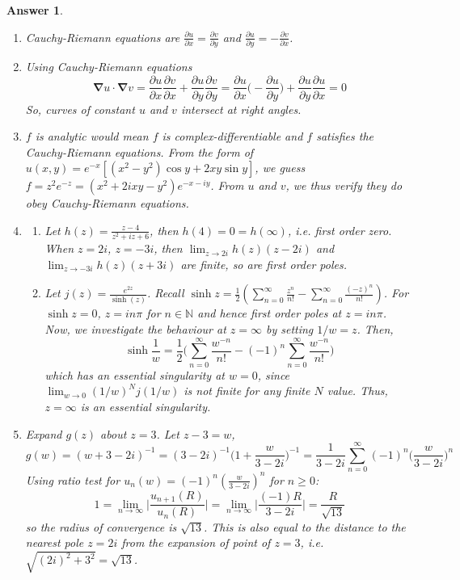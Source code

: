 \documentclass[a4paper]{article}
\newtheorem{ans}{Answer}[section]
\theoremstyle{new}
\begin{document}
\begin{ans}\leavevmode
\begin{enumerate}[label=(\alph*)]
\item Cauchy-Riemann equations are $\frac{\partial u}{\partial x}=\frac{\partial v}{\partial y}$ and $\frac{\partial u}{\partial y}=-\frac{\partial v}{\partial x}$.
\item Using Cauchy-Riemann equations
$$\boldsymbol{\nabla}u\cdot\boldsymbol{\nabla}v=\frac{\partial u}{\partial x}\frac{\partial v}{\partial x}+\frac{\partial u}{\partial y}\frac{\partial v}{\partial y}=\frac{\partial u}{\partial x}\bigg(-\frac{\partial u}{\partial y}\bigg)+\frac{\partial u}{\partial y}\frac{\partial u}{\partial x}=0$$
So, curves of constant $u$ and $v$ intersect at right angles.
\item $f$ is analytic would mean $f$ is complex-differentiable and $f$ satisfies the Cauchy-Riemann equations. From the form of $u(x,y)=e^{-x}[(x^2-y^2)\cos y+2xy\sin y]$, we guess $f=z^2e^{-z}=(x^2+2ixy-y^2)e^{-x-iy}$. From $u$ and $v$, we thus verify they do obey Cauchy-Riemann equations.
\item 
\begin{enumerate}[label=(\roman*)]
\item Let $h(z)=\frac{z-4}{z^2+iz+6}$, then $h(4)=0=h(\infty)$, i.e. first order zero. When $z=2i$, $z=-3i$, then $\lim_{z\rightarrow 2i}h(z)(z-2i)$ and $\lim_{z\rightarrow -3i}h(z)(z+3i)$ are finite, so are first order poles.
\item Let $j(z)=\frac{e^{2z}}{\sinh(z)}$. Recall $\sinh z=\frac{1}{2}(\sum_{n=0}^\infty\frac{z^n}{n!}-\sum_{n=0}^\infty\frac{(-z)^n}{n!})$. For $\sinh z=0$, $z=in\pi$ for $n\in\mathbb{N}$ and hence first order poles at $z=in\pi$. Now, we investigate the behaviour at $z=\infty$ by setting $1/w=z$. Then,
$$\sinh\frac{1}{w}=\frac{1}{2}\bigg(\sum_{n=0}^\infty\frac{w^{-n}}{n!}-(-1)^n\sum_{n=0}^\infty\frac{w^{-n}}{n!}\bigg)$$
which has an essential singularity at $w=0$, since $\lim_{w\rightarrow 0}(1/w)^Nj(1/w)$ is not finite for any finite $N$ value. Thus, $z=\infty$ is an essential singularity.
\end{enumerate}
\item Expand $g(z)$ about $z=3$. Let $z-3=w$,
$$g(w)=(w+3-2i)^{-1}=(3-2i)^{-1}\bigg(1+\frac{w}{3-2i}\bigg)^{-1}=\frac{1}{3-2i}\sum_{n=0}^\infty (-1)^n\bigg(\frac{w}{3-2i}\bigg)^n$$
Using ratio test for $u_n(w)=(-1)^n(\frac{w}{3-2i})^n$ for $n\geq 0$:
$$1=\lim_{n\rightarrow\infty}\bigg|\frac{u_{n+1}(R)}{u_n(R)}\bigg|=\lim_{n\rightarrow\infty}\bigg|\frac{(-1)R}{3-2i}\bigg|=\frac{R}{\sqrt{13}}$$
so the radius of convergence is $\sqrt{13}$. This is also equal to the distance to the nearest pole $z=2i$ from the expansion of point of $z=3$, i.e. $\sqrt{(2i)^2+3^2}=\sqrt{13}$. 
\end{enumerate}
\end{ans}
\end{document}
